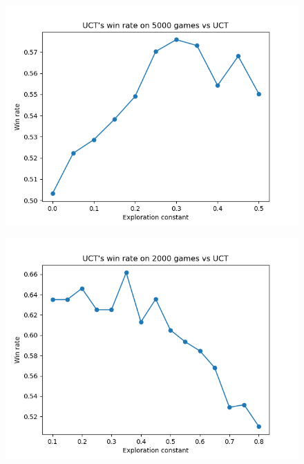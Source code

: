 \documentclass[a4paper]{article}
\theoremstyle{definition}
\begin{document}
\begin{figure}[h]
\centering
\includegraphics[scale=0.7]{test2.png}
\caption{}
\end{figure}

\begin{figure}[h]
\centering
\includegraphics[scale=0.7]{test3.png}
\caption{}
\end{figure}
\end{document}
